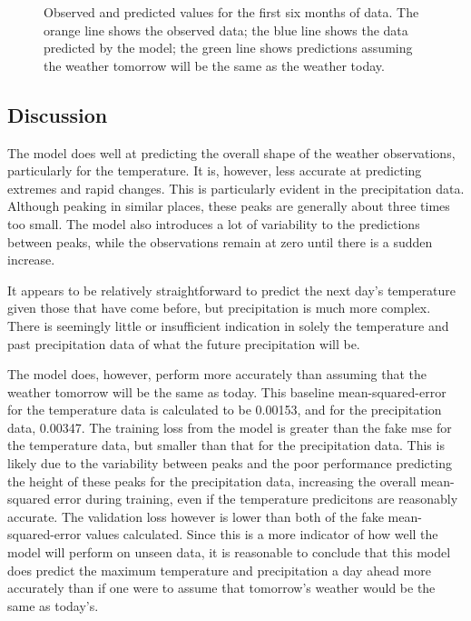 \documentclass[12pt]{article}
\begin{document}
    \begin{figure}
        \centering
        
        \caption{Observed and predicted values for the first six months of data. The orange line shows the observed data; the blue line 
        shows the data predicted by the model; the green line shows predictions assuming the weather tomorrow will be the same as the weather today.}
        \label{fig:weather_detailed_prediction}
    \end{figure}

\subsection{Discussion}

    The model does well at predicting the overall shape of the weather observations, particularly for the temperature. It is, however, less 
    accurate at predicting extremes and rapid changes. This is particularly evident in the precipitation data. Although peaking in similar 
    places, these peaks are generally about three times too small. The model also introduces a lot of variability to the predictions between 
    peaks, while the observations remain at zero until there is a sudden increase. 

    It appears to be relatively straightforward to predict the next day's temperature given those that have come before, but precipitation 
    is much more complex. There is seemingly little or insufficient indication in solely the temperature and past precipitation data of 
    what the future precipitation will be.
    
    The model does, however, perform more accurately than assuming that the weather tomorrow will be the same as today. This baseline 
    mean-squared-error for the temperature data is calculated to be 0.00153, and for the precipitation data, 0.00347. The training loss from 
    the model is greater than the fake mse for the temperature data, but smaller than that for the precipitation data. This is likely due to 
    the variability between peaks and the poor performance predicting the height of these peaks for the precipitation data, increasing the 
    overall mean-squared error during training, even if the temperature predicitons are reasonably accurate. The validation loss however is 
    lower than both of the fake mean-squared-error values calculated. Since this is a more indicator of how well the model will perform on 
    unseen data, it is reasonable to conclude that this model does predict the maximum temperature and precipitation a day ahead more accurately 
    than if one were to assume that tomorrow's weather would be the same as today's.
\end{document}
